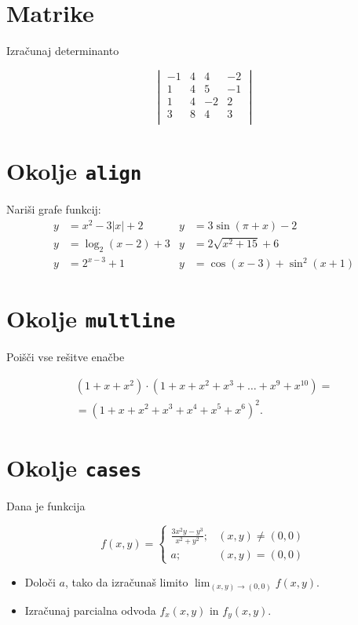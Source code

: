\documentclass[a4paper,12pt]{article}
\begin{document}
\section*{Matrike}
Izračunaj determinanto
   
   \[\begin{vmatrix}
      -1 & 4 & 4 & -2 \\
      1 & 4 & 5 & -1 \\
      1 & 4 & -2 & 2 \\
      3 & 8 & 4 & 3 \\
   \end{vmatrix}\]

\section*{Okolje \texttt{align}}
Nariši grafe funkcij:
\begin{align*}
   y &= x^2 - 3|x| + 2    &   y &= 3 \sin(\pi+x) - 2 \\
   y &= \log_2(x-2) + 3   &   y &= 2 \sqrt{x^2+15} + 6 \\
   y &= 2^{x-3} + 1       &   y &= \cos(x-3) + \sin^2(x+1) 
\end{align*}

\section*{Okolje \texttt{multline}}
Poišči vse rešitve enačbe

\begin{multline*}
   (1+x+x^2) \cdot (1+x+x^2+x^3+\ldots+x^9+x^{10}) = \\
   =(1+x+x^2+x^3+x^4+x^5+x^6)^2.
\end{multline*}

\section*{Okolje \texttt{cases}}
Dana je funkcija
   
   \[f(x,y)= \begin{cases}
      \frac{3x^2y-y^3}{x^2+y^2}; &(x,y) \neq (0,0) \\
      a; &(x,y)= (0,0)
   \end{cases}\]
\begin{itemize}
\item Določi \(a\), tako da izračunaš limito \( \lim_{(x,y)\to(0,0)} f(x,y) \).
\item Izračunaj parcialna odvoda \(f_x(x,y)\) in \(f_y(x,y)\).
\end{itemize}
\end{document}
